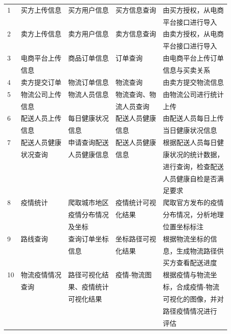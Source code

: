 \documentclass[12pt]{article}
\begin{document}
\begin{center}
\begin{supertabular}{lllll}
	1 &	买方上传信息 &	买方用户信息	& 买方信息查询 &	由买方授权，从电商 \\ &&&& 平台接口进行导入 \\
	2 &	卖方上传信息 &	卖方用户信息 &	卖方信息查询 & 由卖方授权，从电商 \\ &&&& 平台接口进行导入 \\
	3 &	电商平台上传 &	商品订单信息 &	订单查询 &	由电商平台上传订单 \\ & 信息 &&& 信息与买卖关系 \\
	4 & 卖方提交订单 & 物流订单信息  &	物流查询  &	由卖方提交物流信息 \\
	5 &	物流公司上传 &	物流人员信息 &	物流查询、物 &	由物流公司进行统计 \\ & 信息 & & 流人员查询 & 上传 \\
	6 &	配送人员上传 &	每日健康状况 &	配送人员健康 &	由配送人员每日上传 \\ & 信息 & 信息 & 信息 & 当日健康状况信息 \\
	7 &	配送人员健康 &	申请查询配送 &	配送人员健康 &	根据配送人员每日健 \\ & 状况查询 & 人员健康信息 & 信息 & 康状况的统计数据，\\ &&&& 进行查询，检查配送 \\ &&&& 人员健康自检是否满 \\ &&&& 足要求 \\
	8 &	疫情统计 &	爬取城市地区 &	疫情统计可视 &	爬取官方发布的疫情 \\ && 疫情分布情况 & 化结果 & 分布情况，分析地理 \\ && 及坐标 && 位置坐标标注 \\
	9 &	路线查询 &	查询订单坐标 &	坐标路径可视 &	根据物流坐标的信 \\ && 信息 & 化结果 & 息，生成物流路径供 \\ &&&& 买方查看配送进度 \\
	10 &	物流疫情情况 &	路径可视化结 & 疫情-物流图 &	根据疫情与物流坐 \\ & 查询 & 果、疫情统计 && 标，合成疫情-物流 \\ && 可视化结果 && 可视化的图像，并对 \\ &&&& 路径疫情情况进行 \\ &&&& 评估 \\
\end{supertabular}
\end{center}
\end{document}
